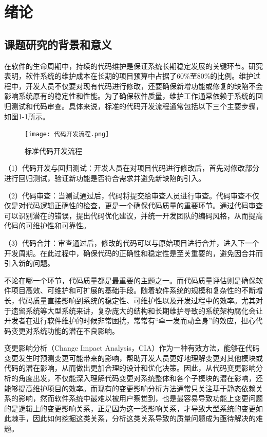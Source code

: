 
\chapter{绪论}

\section{课题研究的背景和意义}

在软件的生命周期中，持续的代码维护是保证系统长期稳定发展的关键环节。研究表明，软件系统的维护成本在长期的项目预算中占据了60\%至80\%的比例\cite{2012Maintenance}。维护过程中，开发人员不仅要对现有代码进行修改，还要确保新增功能或修复的缺陷不会影响系统原有的稳定性和性能。为了确保软件质量，维护工作通常依赖于系统的回归测试和代码审查。具体来说，标准的代码开发流程通常包括以下三个主要步骤，如图1-1所示。

\begin{figure}[h]
\centering
\texttt{[image: 代码开发流程.png]}
\caption{标准代码开发流程}
\end{figure}

（1）代码开发与回归测试：开发人员在对项目代码进行修改后，首先对修改部分进行回归测试，验证新功能是否符合需求并避免新缺陷的引入。

（2）代码审查：当测试通过后，代码将提交给审查人员进行审查。代码审查不仅仅是对代码逻辑正确性的检查，更是一个确保代码质量的重要环节。通过代码审查可以识别潜在的错误，提出代码优化建议，并统一开发团队的编码风格，从而提高代码的可维护性和可靠性。

（3）代码合并：审查通过后，修改的代码可以与原始项目进行合并，进入下一个开发周期。在此过程中，确保代码的正确性和稳定性是至关重要的，避免因合并而引入新的问题。

不论在哪一个环节，代码质量都是最重要的主题之一。而代码质量评估则是确保软件项目高效、可维护和可扩展的基础手段。随着软件系统的规模和复杂性的不断增长，代码质量直接影响到系统的稳定性、可维护性以及开发过程中的效率。尤其对于遗留系统等大型系统来讲，复杂庞大的结构和长期维护导致的系统架构腐化会让开发者在进行软件维护的时候非常困扰，常常有“牵一发而动全身”的效应，担心代码变更对系统功能的潜在不良影响。

变更影响分析（Change Impact Analysis，CIA）作为一种有效方法，能够在代码变更发生时预测变更可能带来的影响，帮助开发人员更好地理解变更对其他模块或代码的潜在影响，从而做出更加合理的设计和优化决策。因此，从代码变更影响分析的角度出发，不仅能深入理解代码变更对系统整体和各个子模块的潜在影响，还能够提高维护项目的效率\cite{2022An}。而现有的变更影响分析方法通常只关注基于静态依赖关系的影响，然而软件系统中最难以被用户察觉到，也是最容易导致功能上变更问题的是逻辑上的变更影响关系，正是因为这一类影响关系，才导致大型系统的变更如此棘手，因此如何挖掘这类关系，分析这类关系导致的质量问题成为亟待解决的难题。

